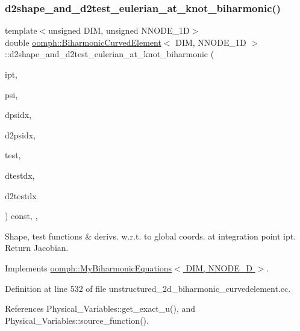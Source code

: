 \subsubsection{\texorpdfstring{d2shape\+\_\+and\+\_\+d2test\+\_\+eulerian\+\_\+at\+\_\+knot\+\_\+biharmonic()}{d2shape\_and\_d2test\_eulerian\_at\_knot\_biharmonic()}}
{\footnotesize\ttfamily template$<$unsigned D\+IM, unsigned N\+N\+O\+D\+E\+\_\+1D$>$ \\
double \hyperlink{classoomph_1_1BiharmonicCurvedElement}{oomph\+::\+Biharmonic\+Curved\+Element}$<$ D\+IM, N\+N\+O\+D\+E\+\_\+1D $>$\+::d2shape\+\_\+and\+\_\+d2test\+\_\+eulerian\+\_\+at\+\_\+knot\+\_\+biharmonic (\begin{DoxyParamCaption}\item[{const unsigned \&}]{ipt,  }\item[{Shape \&}]{psi,  }\item[{D\+Shape \&}]{dpsidx,  }\item[{D\+Shape \&}]{d2psidx,  }\item[{Shape \&}]{test,  }\item[{D\+Shape \&}]{dtestdx,  }\item[{D\+Shape \&}]{d2testdx }\end{DoxyParamCaption}) const\hspace{0.3cm}{\ttfamily [inline]}, {\ttfamily [protected]}, {\ttfamily [virtual]}}



Shape, test functions \& derivs. w.\+r.\+t. to global coords. at integration point ipt. Return Jacobian. 



Implements \hyperlink{classoomph_1_1MyBiharmonicEquations_a85687f39c0fb72f25ce67f5867a83470}{oomph\+::\+My\+Biharmonic\+Equations$<$ D\+I\+M, N\+N\+O\+D\+E\+\_\+D $>$}.



Definition at line 532 of file unstructured\+\_\+2d\+\_\+biharmonic\+\_\+curvedelement.\+cc.



References Physical\+\_\+\+Variables\+::get\+\_\+exact\+\_\+u(), and Physical\+\_\+\+Variables\+::source\+\_\+function().

\mbox{\label{classoomph_1_1BiharmonicCurvedElement_aabae0edfbfa93f138e7a2c6421dfcfcd}} 
